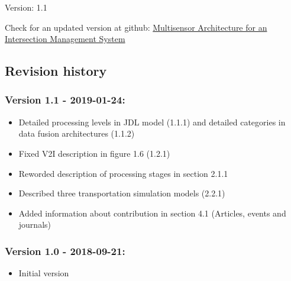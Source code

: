 \begin{titlepage}
    \begin{center}
%   
%        
%		        
%        
%        
%        
%		
%        
{}
Version: 1.1 \\
\vspace{2cm}

      
\end{center}
    
Check for an updated version at github: 
\href{https://github.com/gustavovelascoh/msc-report/raw/master/main.pdf}{Multisensor Architecture for an Intersection Management System}


\subsection*{Revision history}
\subsubsection*{Version 1.1 - 2019-01-24:}

	\begin{itemize}
	\item Detailed processing levels in JDL model (1.1.1) and detailed categories in data fusion architectures (1.1.2)
	\item Fixed V2I description in figure 1.6 (1.2.1)
	\item Reworded description of processing stages in section 2.1.1
	\item Described three transportation simulation models (2.2.1)
	\item Added information about contribution in section 4.1 (Articles, events and journals)
	\end{itemize}


\subsubsection*{Version 1.0 - 2018-09-21:}
	\begin{itemize}
	\item Initial version
	\end{itemize}


\end{titlepage}